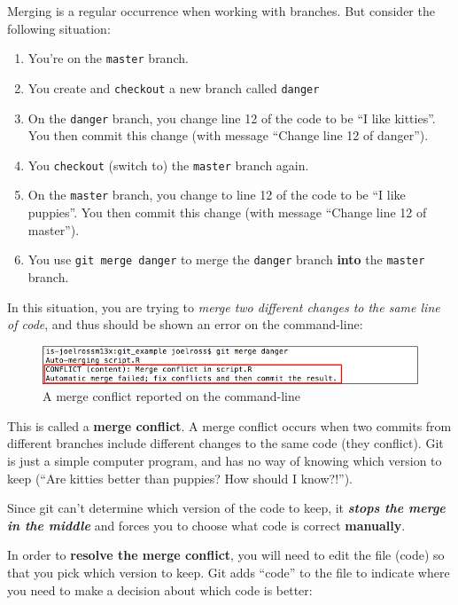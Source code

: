 \documentclass[]{book}
\providecommand{\tightlist}{%
  \setlength{\itemsep}{0pt}\setlength{\parskip}{0pt}}
\theoremstyle{definition}
\theoremstyle{definition}
\theoremstyle{remark}
\begin{document}
Merging is a regular occurrence when working with branches. But consider
the following situation:

\begin{enumerate}
\def\labelenumi{\arabic{enumi}.}
\tightlist
\item
  You're on the \texttt{master} branch.
\item
  You create and \texttt{checkout} a new branch called \texttt{danger}
\item
  On the \texttt{danger} branch, you change line 12 of the code to be
  ``I like kitties''. You then commit this change (with message ``Change
  line 12 of danger'').
\item
  You \texttt{checkout} (switch to) the \texttt{master} branch again.
\item
  On the \texttt{master} branch, you change to line 12 of the code to be
  ``I like puppies''. You then commit this change (with message ``Change
  line 12 of master'').
\item
  You use \texttt{git\ merge\ danger} to merge the \texttt{danger}
  branch \textbf{into} the \texttt{master} branch.
\end{enumerate}

In this situation, you are trying to \emph{merge two different changes
to the same line of code}, and thus should be shown an error on the
command-line:

\begin{figure}
\centering
\includegraphics{img/git-branches/merge-conflict-error.png}
\caption{A merge conflict reported on the command-line}
\end{figure}

This is called a \textbf{merge conflict}. A merge conflict occurs when
two commits from different branches include different changes to the
same code (they conflict). Git is just a simple computer program, and
has no way of knowing which version to keep (``Are kitties better than
puppies? How should I know?!'').

Since git can't determine which version of the code to keep, it
\textbf{\emph{stops the merge in the middle}} and forces you to choose
what code is correct \textbf{manually}.

In order to \textbf{resolve the merge conflict}, you will need to edit
the file (code) so that you pick which version to keep. Git adds
``code'' to the file to indicate where you need to make a decision about
which code is better:
\end{document}
